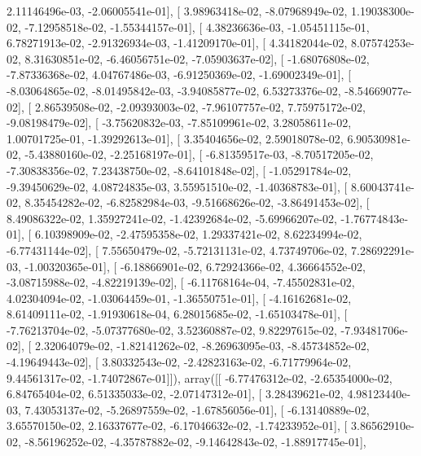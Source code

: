 \documentclass{article}
\begin{document}
          2.11146496e-03,  -2.06005541e-01],
       [  3.98963418e-02,  -8.07968949e-02,   1.19038300e-02,
         -7.12958518e-02,  -1.55344157e-01],
       [  4.38236636e-03,  -1.05451115e-01,   6.78271913e-02,
         -2.91326934e-03,  -1.41209170e-01],
       [  4.34182044e-02,   8.07574253e-02,   8.31630851e-02,
         -6.46056751e-02,  -7.05903637e-02],
       [ -1.68076808e-02,  -7.87336368e-02,   4.04767486e-03,
         -6.91250369e-02,  -1.69002349e-01],
       [ -8.03064865e-02,  -8.01495842e-03,  -3.94085877e-02,
          6.53273376e-02,  -8.54669077e-02],
       [  2.86539508e-02,  -2.09393003e-02,  -7.96107757e-02,
          7.75975172e-02,  -9.08198479e-02],
       [ -3.75620832e-03,  -7.85109961e-02,   3.28058611e-02,
          1.00701725e-01,  -1.39292613e-01],
       [  3.35404656e-02,   2.59018078e-02,   6.90530981e-02,
         -5.43880160e-02,  -2.25168197e-01],
       [ -6.81359517e-03,  -8.70517205e-02,  -7.30838356e-02,
          7.23438750e-02,  -8.64101848e-02],
       [ -1.05291784e-02,  -9.39450629e-02,   4.08724835e-03,
          3.55951510e-02,  -1.40368783e-01],
       [  8.60043741e-02,   8.35454282e-02,  -6.82582984e-03,
         -9.51668626e-02,  -3.86491453e-02],
       [  8.49086322e-02,   1.35927241e-02,  -1.42392684e-02,
         -5.69966207e-02,  -1.76774843e-01],
       [  6.10398909e-02,  -2.47595358e-02,   1.29337421e-02,
          8.62234994e-02,  -6.77431144e-02],
       [  7.55650479e-02,  -5.72131131e-02,   4.73749706e-02,
          7.28692291e-03,  -1.00320365e-01],
       [ -6.18866901e-02,   6.72924366e-02,   4.36664552e-02,
         -3.08715988e-02,  -4.82219139e-02],
       [ -6.11768164e-04,  -7.45502831e-02,   4.02304094e-02,
         -1.03064459e-01,  -1.36550751e-01],
       [ -4.16162681e-02,   8.61409111e-02,  -1.91930618e-04,
          6.28015685e-02,  -1.65103478e-01],
       [ -7.76213704e-02,  -5.07377680e-02,   3.52360887e-02,
          9.82297615e-02,  -7.93481706e-02],
       [  2.32064079e-02,  -1.82141262e-02,  -8.26963095e-03,
         -8.45734852e-02,  -4.19649443e-02],
       [  3.80332543e-02,  -2.42823163e-02,  -6.71779964e-02,
          9.44561317e-02,  -1.74072867e-01]]), array([[ -6.77476312e-02,  -2.65354000e-02,   6.84765404e-02,
          6.51335033e-02,  -2.07147312e-01],
       [  3.28439621e-02,   4.98123440e-03,   7.43053137e-02,
         -5.26897559e-02,  -1.67856056e-01],
       [ -6.13140889e-02,   3.65570150e-02,   2.16337677e-02,
         -6.17046632e-02,  -1.74233952e-01],
       [  3.86562910e-02,  -8.56196252e-02,  -4.35787882e-02,
         -9.14642843e-02,  -1.88917745e-01],
\end{document}
